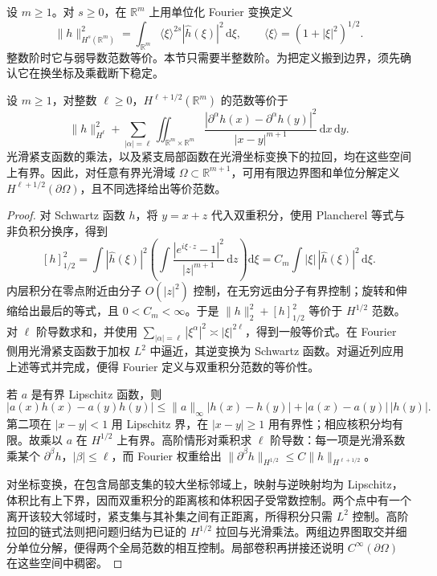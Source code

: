 设 \(m\ge1\)。对 \(s\ge0\)，在 \(\mathbb R^m\) 上用单位化 Fourier 变换定义
\[
	\|h\|_{H^s(\mathbb R^m)}^2
	=\int_{\mathbb R^m}\langle\xi\rangle^{2s}|\widehat h(\xi)|^2\,\mathrm d\xi,
	\qquad \langle\xi\rangle=(1+|\xi|^2)^{1/2}.
\]
整数阶时它与弱导数范数等价。本节只需要半整数阶。为把定义搬到边界，须先确认它在换坐标及乘截断下稳定。

\begin{lemma}\label{g3:lem:half-integer-localization}
	设 \(m\ge1\)，对整数 \(\ell\ge0\)，\(H^{\ell+1/2}(\mathbb R^m)\) 的范数等价于
	\[
	\|h\|_{H^\ell}^2+
	\sum_{|\alpha|=\ell}
	\iint_{\mathbb R^m\times\mathbb R^m}
	\frac{|\partial^\alpha h(x)-\partial^\alpha h(y)|^2}
						{|x-y|^{m+1}}\,\mathrm dx\,\mathrm dy.
	\]
	光滑紧支函数的乘法，以及紧支局部函数在光滑坐标变换下的拉回，均在这些空间上有界。因此，对任意有界光滑域 \(\Omega\subset\mathbb R^{m+1}\)，可用有限边界图和单位分解定义
	\(H^{\ell+1/2}(\partial\Omega)\)，且不同选择给出等价范数。
\end{lemma}
\begin{proof}
	对 Schwartz 函数 \(h\)，将 \(y=x+z\) 代入双重积分，使用 Plancherel 等式与非负积分换序，得到
	\[
	[h]_{1/2}^2
	=\int|\widehat h(\xi)|^2
			\left(\int\frac{|e^{i\xi\cdot z}-1|^2}{|z|^{m+1}}\,\mathrm dz\right)\mathrm d\xi
	=C_m\int|\xi|\,|\widehat h(\xi)|^2\,\mathrm d\xi.
	\]
	内层积分在零点附近由分子 \(O(|z|^2)\) 控制，在无穷远由分子有界控制；旋转和伸缩给出最后的等式，且 \(0<C_m<\infty\)。于是
	\(\|h\|_2^2+[h]_{1/2}^2\) 等价于 \(H^{1/2}\) 范数。对 \(\ell\) 阶导数求和，并使用
	\(\sum_{|\alpha|=\ell}|\xi^\alpha|^2\asymp|\xi|^{2\ell}\)，得到一般等价式。在 Fourier 侧用光滑紧支函数于加权 \(L^2\) 中逼近，其逆变换为 Schwartz 函数。对逼近列应用上述等式并完成，便得 Fourier 定义与双重积分范数的等价性。

	若 \(a\) 是有界 Lipschitz 函数，则
	\[
	|a(x)h(x)-a(y)h(y)|
	\le \|a\|_\infty|h(x)-h(y)|
						+|a(x)-a(y)|\,|h(y)|.
	\]
	第二项在 \(|x-y|<1\) 用 Lipschitz 界，在 \(|x-y|\ge1\) 用有界性；相应核积分均有限。故乘以 \(a\) 在 \(H^{1/2}\) 上有界。高阶情形对乘积求 \(\ell\) 阶导数：每一项是光滑系数乘某个 \(\partial^\beta h\)，\(|\beta|\le\ell\)，而 Fourier 权重给出
	\(\|\partial^\beta h\|_{H^{1/2}}\le C\|h\|_{H^{\ell+1/2}}\)。

	对坐标变换，在包含局部支集的较大坐标邻域上，映射与逆映射均为 Lipschitz，体积比有上下界，因而双重积分的距离核和体积因子受常数控制。两个点中有一个离开该较大邻域时，紧支集与其补集之间有正距离，所得积分只需 \(L^2\) 控制。高阶拉回的链式法则把问题归结为已证的 \(H^{1/2}\) 拉回与光滑乘法。两组边界图取交并细分单位分解，便得两个全局范数的相互控制。局部卷积再拼接还说明 \(C^\infty(\partial\Omega)\) 在这些空间中稠密。
\end{proof}

